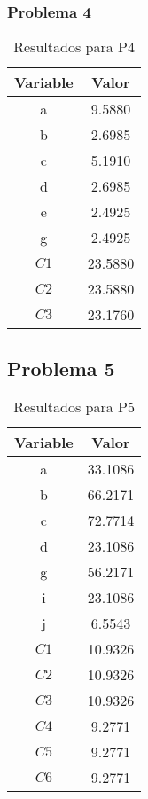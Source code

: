 \documentclass[letterpaper,12pt]{article}
\begin{document}
\subsubsection{Problema 4}
\begin{table}[h!]
    \centering
    \begin{tabular}{|c|c|}
    \hline
    \textbf{Variable} & \textbf{Valor} \\ \hline
    a            & 9.5880         \\ \hline
    b            & 2.6985         \\ \hline
    c            & 5.1910         \\ \hline
    d            & 2.6985         \\ \hline
    e           & 2.4925         \\ \hline
    g            & 2.4925         \\ \hline
    $C1$              & 23.5880        \\ \hline
    $C2$              & 23.5880        \\ \hline
    $C3$              & 23.1760        \\ \hline
    \end{tabular}
    \caption{Resultados para P4}
\end{table}

\subsection{Problema 5}
\begin{table}[h!]
    \centering
    \begin{tabular}{|c|c|}
    \hline
    \textbf{Variable} & \textbf{Valor} \\ \hline
    a            & 33.1086        \\ \hline
    b            & 66.2171        \\ \hline
    c            & 72.7714        \\ \hline
    d            & 23.1086        \\ \hline
    g            & 56.2171        \\ \hline
    i            & 23.1086        \\ \hline
    j            & 6.5543         \\ \hline
    $C1$              & 10.9326        \\ \hline
    $C2$              & 10.9326        \\ \hline
    $C3$              & 10.9326        \\ \hline
    $C4$              & 9.2771         \\ \hline
    $C5$              & 9.2771         \\ \hline
    $C6$              & 9.2771        \\ \hline
    \end{tabular}
    \caption{Resultados para P5}
    \end{table}
    
\end{document}
